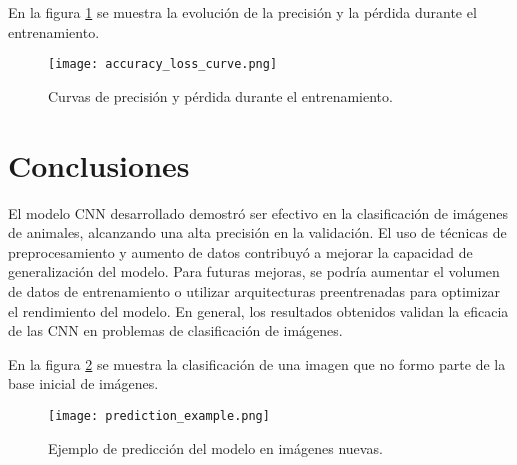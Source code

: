 \documentclass[conference]{IEEEtran}
\begin{document}
\FloatBarrier

En la figura \ref{fig:training_curves} se muestra la evolución de la precisión y la pérdida durante el entrenamiento.

\begin{figure}[h]
    \centering
    \texttt{[image: accuracy\_loss\_curve.png]}
    \caption{Curvas de precisión y pérdida durante el entrenamiento.}
    \label{fig:training_curves}
\end{figure}

\FloatBarrier



\section{Conclusiones}

El modelo CNN desarrollado demostró ser efectivo en la clasificación de imágenes de animales, alcanzando una alta precisión en la validación. El uso de técnicas de preprocesamiento y aumento de datos contribuyó a mejorar la capacidad de generalización del modelo. Para futuras mejoras, se podría aumentar el volumen de datos de entrenamiento o utilizar arquitecturas preentrenadas para optimizar el rendimiento del modelo. En general, los resultados obtenidos validan la eficacia de las CNN en problemas de clasificación de imágenes.


En la figura \ref{fig:predictions} se muestra la clasificación de una imagen que no formo parte de la base inicial de imágenes.

\FloatBarrier

\begin{figure}[h]
    \centering
    \texttt{[image: prediction\_example.png]}
    \caption{Ejemplo de predicción del modelo en imágenes nuevas.}
    \label{fig:predictions}
\end{figure}
\end{document}
